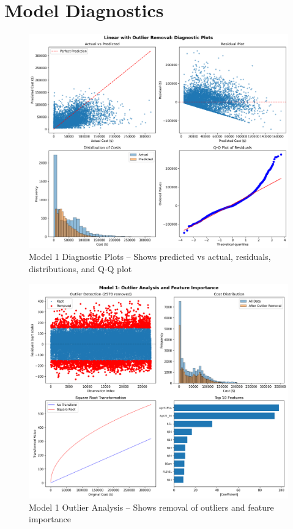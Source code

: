 \section{Model Diagnostics}

\begin{figure}[h!]
\centering
\includegraphics[width=\textwidth]{models/model_1/diagnostic_plots.png}
\caption{Model 1 Diagnostic Plots -- Shows predicted vs actual, residuals, distributions, and Q-Q plot}
\label{fig:model1_diagnostics}
\end{figure}

\begin{figure}[h!]
\centering
\includegraphics[width=\textwidth]{models/model_1/model1_specific_diagnostics.png}
\caption{Model 1 Outlier Analysis -- Shows removal of \ModelOneOutliersRemoved{} outliers and feature importance}
\label{fig:model1_specific}
\end{figure}


